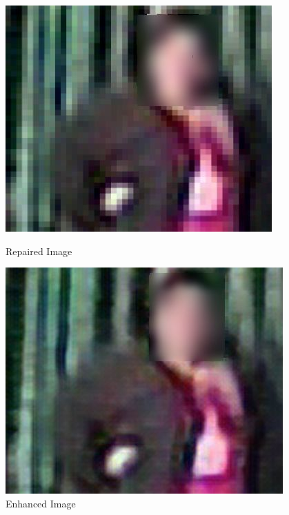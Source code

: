 \documentclass[a4paper]{article}
\begin{document}
\begin{figure}[H]
\centering
\begin{minipage}[b]{0.45\textwidth}
 \includegraphics[width=\textwidth]{repaired_censored.jpg}
 \caption{Repaired Image}
 \end{minipage}
  \hfill
  \begin{minipage}[b]{0.47\textwidth}
    \includegraphics[width=\textwidth]{zoom1_censored.jpg}
    \caption{Enhanced Image}
  \end{minipage}
\end{figure}
\end{document}
